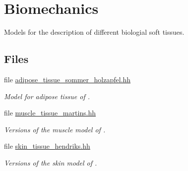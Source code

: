 \hypertarget{group__Biomechanics}{}\section{Biomechanics}
\label{group__Biomechanics}


Models for the description of different biologial soft tissues.  


\subsection*{Files}
\begin{DoxyCompactItemize}
\item 
file \hyperlink{adipose__tissue__sommer__holzapfel_8hh}{adipose\+\_\+tissue\+\_\+sommer\+\_\+holzapfel.\+hh}
\begin{DoxyCompactList}\small\item\em Model for adipose tissue of \cite{Sommer2013}. \end{DoxyCompactList}\item 
file \hyperlink{muscle__tissue__martins_8hh}{muscle\+\_\+tissue\+\_\+martins.\+hh}
\begin{DoxyCompactList}\small\item\em Versions of the muscle model of \cite{Martins1998}. \end{DoxyCompactList}\item 
file \hyperlink{skin__tissue__hendriks_8hh}{skin\+\_\+tissue\+\_\+hendriks.\+hh}
\begin{DoxyCompactList}\small\item\em Versions of the skin model of \cite{Hendriks2005}. \end{DoxyCompactList}\end{DoxyCompactItemize}
